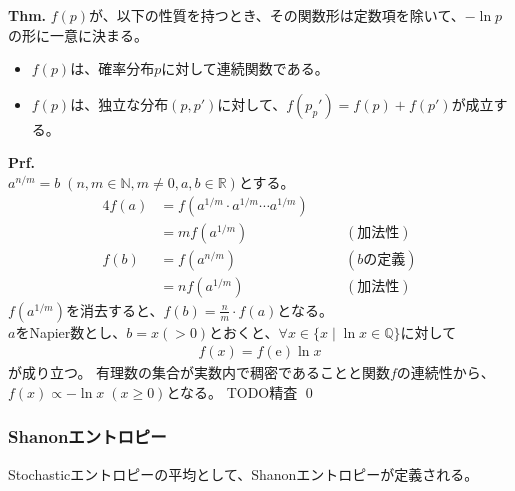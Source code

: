 \documentclass[a4paper,11pt]{jsarticle}
\numberwithin{equation}{section}
\begin{document}
\begin{itembox}[l]{\textbf{Thm.}}
    $f(p)$が、以下の性質を持つとき、その関数形は定数項を除いて、$-\ln p$の形に一意に決まる。
    \begin{itemize}
        \item $f(p)$は、確率分布$p$に対して連続関数である。
        \item $f(p)$は、独立な分布$(p,p')$に対して、$f(p_p') = f(p) + f(p')$が成立する。
    \end{itemize}
\end{itembox}
\textbf{Prf.}\\
\indent
$a^{n/m} = b \; (n, m \in \mathbb{N}, m \neq 0, a, b \in \mathbb{R})$とする。
\begin{alignat*}{4}
  f(a) &= f(a^{1/m} \cdot a^{1/m} \cdots a^{1/m}) \\
  &= m f(a^{1/m}) && \quad (\text{加法性}) \\
  f(b) &= f(a^{n/m}) && \quad (\text{$b$の定義}) \\
  &= n f(a^{1/m}) && \quad (\text{加法性})
\end{alignat*}
$f(a^{1/m})$を消去すると、$f(b)=\frac{n}{m} \cdot f(a)$となる。\\
$a$をNapier数とし、$b=x(>0)$とおくと、$\forall x \in \{ x \mid \ln{x} \in \mathbb{Q} \}$に対して
\begin{align}
  f(x) = f(\mathrm{e}) \ln{x}
\end{align}
が成り立つ。
有理数の集合が実数内で稠密であることと関数$f$の連続性から、\\
$f(x) \propto - \ln{x} \; (x \geq 0)$となる。
TODO精査
\qed\\

\subsubsection{Shanonエントロピー}
Stochasticエントロピーの平均として、Shanonエントロピーが定義される。
\end{document}
